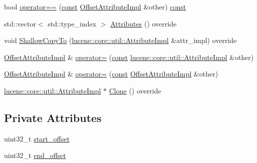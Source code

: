 \begin{DoxyCompactItemize}
\item 
bool \mbox{\hyperlink{classlucene_1_1core_1_1analysis_1_1tokenattributes_1_1OffsetAttributeImpl_a3a7da0e72e05757a8e2c540fc639cca8}{operator==}} (\mbox{\hyperlink{ZlibCrc32_8h_a2c212835823e3c54a8ab6d95c652660e}{const}} \mbox{\hyperlink{classlucene_1_1core_1_1analysis_1_1tokenattributes_1_1OffsetAttributeImpl}{Offset\+Attribute\+Impl}} \&other) \mbox{\hyperlink{ZlibCrc32_8h_a2c212835823e3c54a8ab6d95c652660e}{const}}
\item 
std\+::vector$<$ std\+::type\+\_\+index $>$ \mbox{\hyperlink{classlucene_1_1core_1_1analysis_1_1tokenattributes_1_1OffsetAttributeImpl_ac2f3c035417acfc9056a900903f1d271}{Attributes}} () override
\item 
void \mbox{\hyperlink{classlucene_1_1core_1_1analysis_1_1tokenattributes_1_1OffsetAttributeImpl_a426d0cd75306c4ef7cec3c28e34c0029}{Shallow\+Copy\+To}} (\mbox{\hyperlink{classlucene_1_1core_1_1util_1_1AttributeImpl}{lucene\+::core\+::util\+::\+Attribute\+Impl}} \&attr\+\_\+impl) override
\item 
\mbox{\hyperlink{classlucene_1_1core_1_1analysis_1_1tokenattributes_1_1OffsetAttributeImpl}{Offset\+Attribute\+Impl}} \& \mbox{\hyperlink{classlucene_1_1core_1_1analysis_1_1tokenattributes_1_1OffsetAttributeImpl_ad5aee8c4731cfda2c9a1c7b7dbe4dc30}{operator=}} (\mbox{\hyperlink{ZlibCrc32_8h_a2c212835823e3c54a8ab6d95c652660e}{const}} \mbox{\hyperlink{classlucene_1_1core_1_1util_1_1AttributeImpl}{lucene\+::core\+::util\+::\+Attribute\+Impl}} \&other)
\item 
\mbox{\hyperlink{classlucene_1_1core_1_1analysis_1_1tokenattributes_1_1OffsetAttributeImpl}{Offset\+Attribute\+Impl}} \& \mbox{\hyperlink{classlucene_1_1core_1_1analysis_1_1tokenattributes_1_1OffsetAttributeImpl_ab26c5fb656b41c725bb7207da7877c4a}{operator=}} (\mbox{\hyperlink{ZlibCrc32_8h_a2c212835823e3c54a8ab6d95c652660e}{const}} \mbox{\hyperlink{classlucene_1_1core_1_1analysis_1_1tokenattributes_1_1OffsetAttributeImpl}{Offset\+Attribute\+Impl}} \&other)
\item 
\mbox{\hyperlink{classlucene_1_1core_1_1util_1_1AttributeImpl}{lucene\+::core\+::util\+::\+Attribute\+Impl}} $\ast$ \mbox{\hyperlink{classlucene_1_1core_1_1analysis_1_1tokenattributes_1_1OffsetAttributeImpl_a4cae4e770c4ce5184ae4530edde06bae}{Clone}} () override
\end{DoxyCompactItemize}
\subsection*{Private Attributes}
\begin{DoxyCompactItemize}
\item 
uint32\+\_\+t \mbox{\hyperlink{classlucene_1_1core_1_1analysis_1_1tokenattributes_1_1OffsetAttributeImpl_a1e2b8c747f3f0216a9044b9fd61ea843}{start\+\_\+offset}}
\item 
uint32\+\_\+t \mbox{\hyperlink{classlucene_1_1core_1_1analysis_1_1tokenattributes_1_1OffsetAttributeImpl_a2e25d7e34687e7d39baaaf88636238c7}{end\+\_\+offset}}
\end{DoxyCompactItemize}
